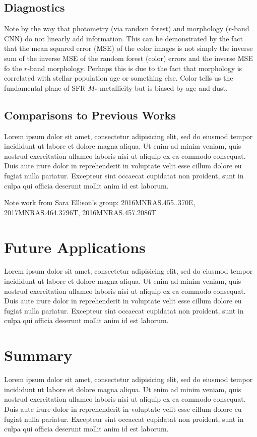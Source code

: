 \documentclass[fleqn,usenatbib]{mnras}
\begin{document}
\subsection{Diagnostics}\label{sec:diagnostics}
Note by the way that photometry (via random forest) and morphology ($r$-band CNN) do not linearly add information.
This can be demonstrated by the fact that the mean squared error (MSE) of the color images is not simply the inverse sum of the inverse MSE of the random forest (color) errors and the inverse MSE fo the $r$-band morphology.
Perhaps this is due to the fact that morphology is correlated with stellar population age or something else.
Color tells us the fundamental plane of SFR-$M_*$-metallicity but is biased by age and dust.

\subsection{Comparisons to Previous Works}\label{sec:previous work}
Lorem ipsum dolor sit amet, consectetur adipisicing elit, sed do eiusmod tempor incididunt ut labore et dolore magna aliqua. Ut enim ad minim veniam, quis nostrud exercitation ullamco laboris nisi ut aliquip ex ea commodo consequat. Duis aute irure dolor in reprehenderit in voluptate velit esse cillum dolore eu fugiat nulla pariatur. Excepteur sint occaecat cupidatat non proident, sunt in culpa qui officia deserunt mollit anim id est laborum.

Note work from Sara Ellison's group: 
2016MNRAS.455..370E, 2017MNRAS.464.3796T, 2016MNRAS.457.2086T 

\section{Future Applications}\label{sec:future}
Lorem ipsum dolor sit amet, consectetur adipisicing elit, sed do eiusmod tempor incididunt ut labore et dolore magna aliqua. Ut enim ad minim veniam, quis nostrud exercitation ullamco laboris nisi ut aliquip ex ea commodo consequat. Duis aute irure dolor in reprehenderit in voluptate velit esse cillum dolore eu fugiat nulla pariatur. Excepteur sint occaecat cupidatat non proident, sunt in culpa qui officia deserunt mollit anim id est laborum.

\section{Summary}\label{sec:summary}
Lorem ipsum dolor sit amet, consectetur adipisicing elit, sed do eiusmod tempor incididunt ut labore et dolore magna aliqua. Ut enim ad minim veniam, quis nostrud exercitation ullamco laboris nisi ut aliquip ex ea commodo consequat. Duis aute irure dolor in reprehenderit in voluptate velit esse cillum dolore eu fugiat nulla pariatur. Excepteur sint occaecat cupidatat non proident, sunt in culpa qui officia deserunt mollit anim id est laborum.
\end{document}
